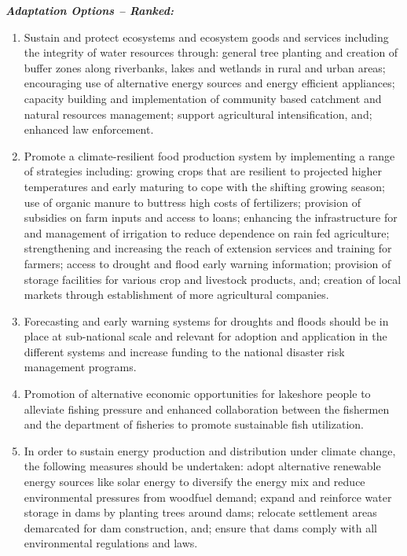 \documentclass[
]{book}
\providecommand{\tightlist}{%
  \setlength{\itemsep}{0pt}\setlength{\parskip}{0pt}}
\begin{document}
\textbf{\emph{Adaptation Options -- Ranked:}}

\begin{enumerate}
\def\labelenumi{\arabic{enumi}.}
\tightlist
\item
  Sustain and protect ecosystems and ecosystem goods and services including the integrity of water resources through: general tree planting and creation of buffer zones along riverbanks, lakes and wetlands in rural and urban areas; encouraging use of alternative energy sources and energy efficient appliances; capacity building and implementation of community based catchment and natural resources management; support agricultural intensification, and; enhanced law enforcement.
\item
  Promote a climate-resilient food production system by implementing a range of strategies including: growing crops that are resilient to projected higher temperatures and early maturing to cope with the shifting growing season; use of organic manure to buttress high costs of fertilizers; provision of subsidies on farm inputs and access to loans; enhancing the infrastructure for and management of irrigation to reduce dependence on rain fed agriculture; strengthening and increasing the reach of extension services and training for farmers; access to drought and flood early warning information; provision of storage facilities for various crop and livestock products, and; creation of local markets through establishment of more agricultural companies.
\item
  Forecasting and early warning systems for droughts and floods should be in place at sub-national scale and relevant for adoption and application in the different systems and increase funding to the national disaster risk management programs.
\item
  Promotion of alternative economic opportunities for lakeshore people to alleviate fishing pressure and enhanced collaboration between the fishermen and the department of fisheries to promote sustainable fish utilization.
\item
  In order to sustain energy production and distribution under climate change, the following measures should be undertaken: adopt alternative renewable energy sources like solar energy to diversify the energy mix and reduce environmental pressures from woodfuel demand; expand and reinforce water storage in dams by planting trees around dams; relocate settlement areas demarcated for dam construction, and; ensure that dams comply with all environmental regulations and laws.

\end{enumerate}
\end{document}
